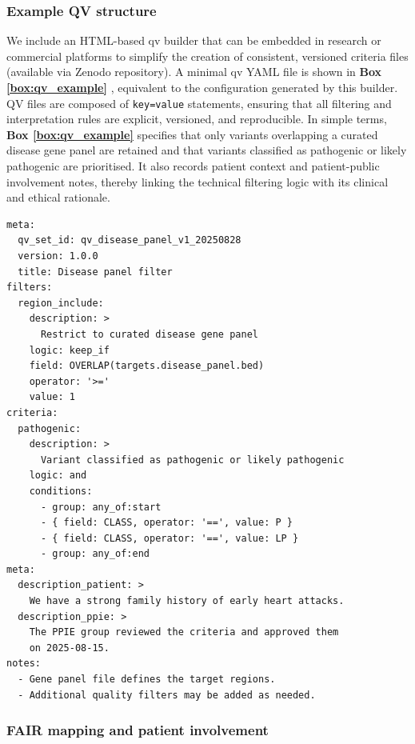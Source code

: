 \subsubsection*{Example QV structure}

We include an HTML-based \ac{qv} builder that can be embedded in research or commercial platforms to simplify the creation of consistent, versioned criteria files (available via Zenodo repository).   
A minimal \ac{qv} YAML file is shown in \textbf{Box \ref{box:qv_example}} , equivalent to the configuration generated by this builder.
QV files are composed of \texttt{key=value} statements, ensuring that all filtering and interpretation rules are explicit, versioned, and reproducible.
In simple terms, \textbf{Box \ref{box:qv_example}} specifies that only variants overlapping a curated disease gene panel are retained and that variants classified as pathogenic or likely pathogenic are prioritised.  
It also records patient context and patient-public involvement notes, thereby linking the technical filtering logic with its clinical and ethical rationale.

\begin{tcolorbox}[
    colback=white!0,
    colframe=black,
    boxrule=1pt,
    arc=1mm,
    outer arc=1mm,
    title=\textbf{\refstepcounter{myboxcounter}\label{box:qv_example}Box \themyboxcounter: qv\_disease\_panel\_example.yaml}
]
\begin{verbatim}
meta:
  qv_set_id: qv_disease_panel_v1_20250828
  version: 1.0.0
  title: Disease panel filter
filters:
  region_include:
    description: >
      Restrict to curated disease gene panel
    logic: keep_if
    field: OVERLAP(targets.disease_panel.bed)
    operator: '>='
    value: 1
criteria:
  pathogenic:
    description: >
      Variant classified as pathogenic or likely pathogenic
    logic: and
    conditions:
      - group: any_of:start
      - { field: CLASS, operator: '==', value: P }
      - { field: CLASS, operator: '==', value: LP }
      - group: any_of:end
meta:
  description_patient: >
    We have a strong family history of early heart attacks.
  description_ppie: >
    The PPIE group reviewed the criteria and approved them
    on 2025-08-15.
notes:
  - Gene panel file defines the target regions.
  - Additional quality filters may be added as needed.
\end{verbatim}
\end{tcolorbox}

\subsubsection*{FAIR mapping and patient involvement}

